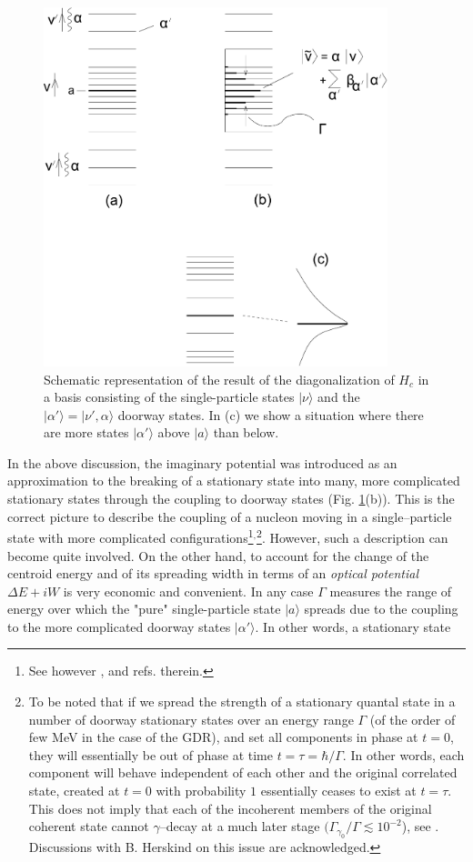 \begin{figure}
\centerline {
\includegraphics*[width=10cm]{introduccion/figs/figintroD5}
}
\caption{Schematic representation of the result of the diagonalization of $H_{c}$ in a basis consisting of the single-particle states $|\nu \rangle$ and the $|\alpha' \rangle=|\nu', {\alpha} \rangle$ doorway states. In (c) we show a situation where there are more states $|\alpha' \rangle$ above $|a\rangle$ than below.}
\label{fig:4.5}
\end{figure}


In the above discussion, the imaginary potential was introduced as an approximation to  the breaking of a stationary state into many, more complicated stationary states through the coupling to doorway states (Fig. \ref{fig:4.5}(b)). This is the  correct picture to describe the coupling of a nucleon moving in a single--particle state with more complicated configurations\footnote{See however \cite{Caldeira:81}, \cite{Caldeira:83} and refs. therein.}$^,$\footnote{To be noted that if we spread the strength of a stationary quantal state in a number of doorway stationary states over an energy range $\Gamma$ (of the order of few MeV in the case of the GDR), and set all components in phase at $t=0$, they will essentially be out of phase at time $t=\tau = \hbar/\Gamma$. In other words, each component will behave independent of each other and the original correlated state, created at $t=0$ with probability $1$ essentially ceases to exist at $t=\tau$. This does not imply that each of the incoherent members of the original coherent state cannot $\gamma$--decay at a much later stage $(\Gamma_{\gamma_0}/\Gamma\lesssim10^{-2}$), see \cite{Bortignon:98}. Discussions with B. Herskind on this issue are acknowledged.}. However, such a description can become quite involved. On the other hand, to account for the change of the centroid energy and of its spreading width in terms of an {\it optical potential $\Delta E + iW$} is very economic and convenient. In any case $\Gamma$ measures the range of energy over which the "pure" single-particle state $|a\rangle$ spreads due to the coupling to the more complicated doorway states $|\alpha'\rangle$. In other words, a stationary state

